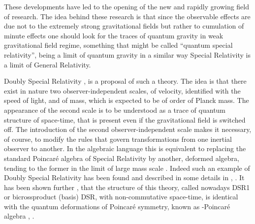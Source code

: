 \documentclass  [12pt] {article}
\begin{document}
These developments have led to the opening of the new and rapidly growing field
of research. The idea behind these research is that since the observable
effects are due not to the extremely strong gravitational fields but rather to
cumulation of minute effects one should look for the traces of quantum gravity
in weak gravitational field regime, something that might be called ``quantum
special relativity'', being a limit of quantum gravity in a similar way Special
Relativity is a limit of General Relativity.

Doubly Special Relativity \cite{Amelino-Camelia:2000ge},
\cite{Amelino-Camelia:2000mn} is a proposal of such a theory. The idea is that
there exist in nature two observer-independent scales, of velocity, identified
with the speed of light, and of mass, which is expected to be of order of
Planck mass. The appearance of the second scale is to be understood as a trace
of quantum structure of space-time, that is present even if the gravitational
field is switched off. The introduction of the second observer-independent
scale makes it necessary, of course, to modify the rules that govern
transformations from one inertial observer to another. In the algebraic
language this is equivalent to replacing the standard Poincar\'e algebra of
Special Relativity by another, deformed algebra, tending to the former in the
limit of large mass scale \myHighlight{$\kappa\rightarrow\infty$}\coordHE{}. Indeed such an example of
Doubly Special Relativity has been found and described in some details in
\cite{jkgminl}, \cite{rbgacjkg}. It has been shown further \cite{juse},
\cite{lunoDSR} that the structure of this theory, called nowadays DSR1 or
bicrossproduct (basis) DSR, with non-commutative space-time, is identical with
the quantum deformations of Poincar\'e symmetry, known as \myHighlight{$\kappa$}\coordHE{}-Poincar\'e
algebra \cite{kappaP}, \cite{kappaM}.
\end{document}
